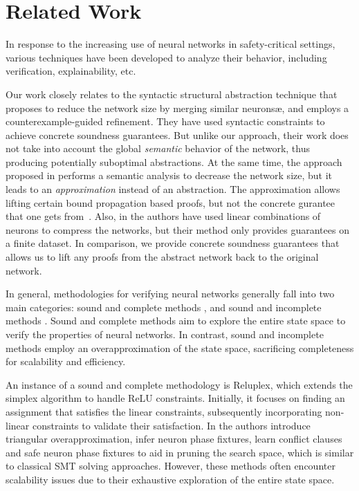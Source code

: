 \section{Related Work}

In response to the increasing use of neural networks in safety-critical settings, 
various techniques have been developed to analyze their behavior, including 
verification, explainability, etc. 

Our work closely relates to the syntactic structural abstraction technique that
proposes to reduce the network size by merging similar
neuronsæ\cite{cegar-nn,cegarette,cleverest-nn}, and employs a
counterexample-guided refinement. They have used
syntactic constraints to achieve concrete soundness guarantees. But unlike our
approach, their work does not take into account the global \textit{semantic}
behavior of the network, thus producing potentially suboptimal abstractions.
At the same time, the approach proposed in \cite{deep-abstract} performs a
semantic analysis to decrease the network size, but it leads to an
\emph{approximation} instead of an abstraction. The approximation allows
lifting certain bound propagation based proofs, but not the concrete gurantee
that one gets from~\cite{cegar-nn}. Also, in \cite{lin-comb-abs-jan} the
authors have used linear combinations of neurons to compress the networks, but
their method only provides guarantees on a finite dataset. In comparison, we
provide concrete soundness guarantees that allows us to lift any proofs from
the abstract network back to the original network.

In general, methodologies for verifying neural networks generally fall into two
main categories: sound and complete methods
\cite{reluplex,formal-ver-piece-wise,comp-reachability-analysis,comp-milp,comp-out-range,comp-max-resilience,marabou,comp-safety-ver-dnn,beta-crown,alpha-crown-bab-fnc,gcp-crown},
and sound and incomplete methods
\cite{deeppoly,crown,incomp-dual-approach,incomp-abs-inp,incomp-robustness-certi,incomp-boost-robustness}.
Sound and complete methods aim to explore the entire state space to verify the
properties of neural networks.
In contrast, sound and incomplete methods employ an overapproximation
of the state space, sacrificing completeness for 
scalability and efficiency.

An instance of a sound and complete methodology is Reluplex, which extends the 
simplex algorithm \cite{simplex} to 
handle ReLU constraints. Initially, it focuses on finding an assignment that 
satisfies the linear constraints, subsequently incorporating non-linear constraints 
to validate their satisfaction. In \cite{formal-ver-piece-wise}
the authors introduce triangular overapproximation, infer neuron phase fixtures,
learn conflict clauses and safe neuron phase fixtures to aid in pruning the search 
space, which is similar to classical SMT solving approaches. However, these methods
often encounter scalability issues due to their exhaustive exploration of the
entire state space. 

